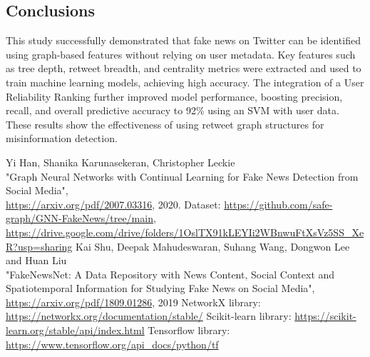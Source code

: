 \documentclass[11pt,a4paper]{article}
\begin{document}
\subsection*{Conclusions}
This study successfully demonstrated that fake news on Twitter can be identified using graph-based features without relying on user metadata. Key features such as tree depth, retweet breadth, and centrality metrics were extracted and used to train machine learning models, achieving high accuracy. The integration of a User Reliability Ranking further improved model performance, boosting precision, recall, and overall predictive accuracy to 92\% using an SVM with user data.
\\These results show the effectiveness of using retweet graph structures for misinformation detection.







\newpage

\begin{thebibliography}{9}
	 Yi Han, Shanika Karunasekeran, Christopher Leckie\\"Graph Neural Networks with Continual Learning for Fake News Detection from Social Media",\\ \url{https://arxiv.org/pdf/2007.03316}, 2020.
	 Dataset: \url{https://github.com/safe-graph/GNN-FakeNews/tree/main},\\\url{https://drive.google.com/drive/folders/1OslTX91kLEYIi2WBnwuFtXsVz5SS_XeR?usp=sharing}
	 Kai Shu, Deepak Mahudeswaran, Suhang Wang, Dongwon Lee and Huan Liu\\"FakeNewsNet: A Data Repository with News Content, Social Context and Spatiotemporal Information for Studying Fake News on Social Media",\\ \url{https://arxiv.org/pdf/1809.01286}, 2019
	 NetworkX library: \url{https://networkx.org/documentation/stable/}
	 Scikit-learn library: \url{https://scikit-learn.org/stable/api/index.html}
	 Tensorflow library: \url{https://www.tensorflow.org/api_docs/python/tf}
\end{thebibliography}

\newpage
\end{document}
